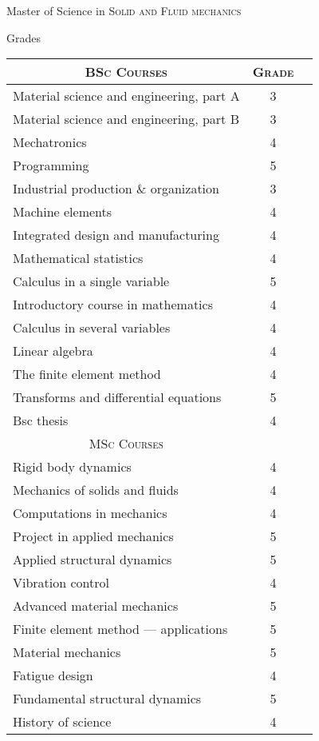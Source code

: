 \documentclass[a4paper,10pt]{article} %
\begin{document}
\newpage


\par{\centering\Large \hypertarget{grds}{Master of Science in \textsc{Solid and Fluid mechanics}}\par}\large{\centering Grades\par}\normalsize

\begin{center}
\begin{tabular}{lcc}

\multicolumn{1}{c}{\textsc{BSc Courses}} & \textsc{Grade}\\
\hline
Material science and engineering, part A  & 3\\
Material science and engineering, part B & 3\\
Mechatronics & 4\\
Programming & 5\\
Industrial production \& organization & 3\\
Machine elements & 4\\
Integrated design and manufacturing & 4\\
Mathematical statistics & 4\\
Calculus in a single variable & 5\\
Introductory course in mathematics & 4\\
Calculus in several variables & 4\\
Linear algebra & 4\\
The finite element method & 4\\
Transforms and differential equations & 5\\
Bsc thesis & 4\\

\multicolumn{1}{c}{\textsc{MSc Courses}} & \\
\hline
Rigid body dynamics & 4\\
Mechanics of solids and fluids & 4\\
Computations in mechanics & 4\\
Project in applied mechanics & 5\\
Applied structural dynamics & 5\\
Vibration control & 4\\
Advanced material mechanics & 5\\
Finite element method --- applications & 5\\
Material mechanics & 5\\
Fatigue design & 4\\
Fundamental structural dynamics & 5\\
History of science & 4\\


\end{tabular}
\end{center}
\end{document}
